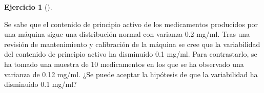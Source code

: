 \documentclass[
  a4paper,
]{scrreport}
\theoremstyle{definition}
\newtheorem{exercise}{Ejercicio}[chapter]
\theoremstyle{remark}
\begin{document}
\begin{exercise}[]\protect\hypertarget{exr-contraste-varianza-principio-activo}{}\label{exr-contraste-varianza-principio-activo}

Se sabe que el contenido de principio activo de los medicamentos
producidos por una máquina sigue una distribución normal con varianza
0.2 mg/ml. Tras una revisión de mantenimiento y calibración de la
máquina se cree que la variabilidad del contenido de principio activo ha
disminuido 0.1 mg/ml. Para contrastarlo, se ha tomado una muestra de 10
medicamentos en los que se ha observado una varianza de 0.12 mg/ml. ¿Se
puede aceptar la hipótesis de que la variabilidad ha disminuido 0.1
mg/ml?

\end{exercise}
\end{document}
